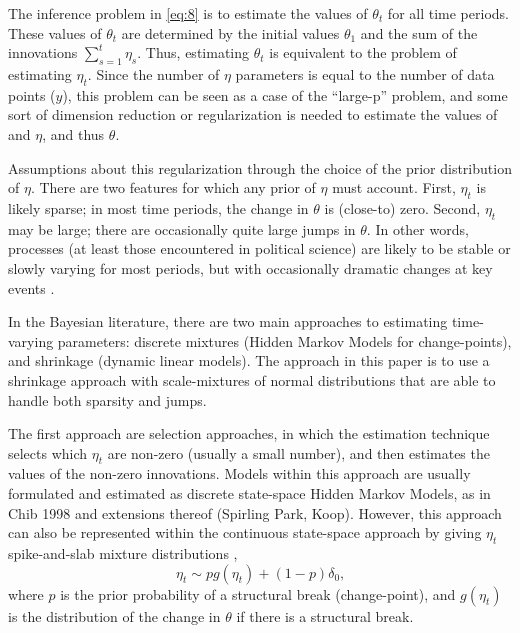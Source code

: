 \documentclass{article}
\begin{document}
The inference problem in \eqref{eq:8} is to estimate the values of $\theta_{t}$ for all time periods.
These values of $\theta_{t}$ are determined by the initial values $\theta_{1}$ and the sum of the innovations $\sum_{s=1}^{t} \eta_{s}$.
Thus, estimating $\theta_{t}$ is equivalent to the problem of estimating $\eta_{t}$.
Since the number of $\eta$ parameters is equal to the number of data points ($y$), this problem can be seen as a case of the ``large-p'' problem, and some sort of dimension reduction or regularization is needed to estimate the values of and $\eta$, and thus $\theta$.

Assumptions about this regularization through the choice of the prior distribution of $\eta$.
There are two features for which any prior of $\eta$ must account.
First, $\eta_{t}$ is likely sparse; in most time periods, the change in $\theta$ is (close-to) zero.
Second, $\eta_{t}$ may be large; there are occasionally quite large jumps in $\theta$.
In other words, processes (at least those encountered in political science) are likely to be stable or slowly varying for most periods, but with occasionally dramatic changes at key events \parencite{RatkovicEng2010}.

In the Bayesian literature, there are two main approaches to estimating time-varying parameters: discrete mixtures (Hidden Markov Models for change-points), and shrinkage (dynamic linear models).
The approach in this paper is to use a shrinkage approach with scale-mixtures of normal distributions that are able to handle both sparsity and jumps.

The first approach are selection approaches, in which the estimation technique selects which $\eta_{t}$ are non-zero (usually a small number), and then estimates the values of the non-zero innovations.
Models within this approach are usually formulated and estimated as discrete state-space Hidden Markov Models, as in Chib 1998 and extensions thereof (Spirling Park, Koop).
However, this approach can also be represented within the continuous state-space approach by giving $\eta_{t}$ spike-and-slab mixture distributions \parencite{GiordaniKohn2008},
\begin{equation}
  \label{eq:1}
  \eta_{t} \sim p g(\eta_{t}) + (1 - p) \delta_{0} \text{,}
\end{equation}
where $p$ is the prior probability of a structural break (change-point), and $g(\eta_{t})$ is the distribution of the change in $\theta$ if there is a structural break.
\end{document}
